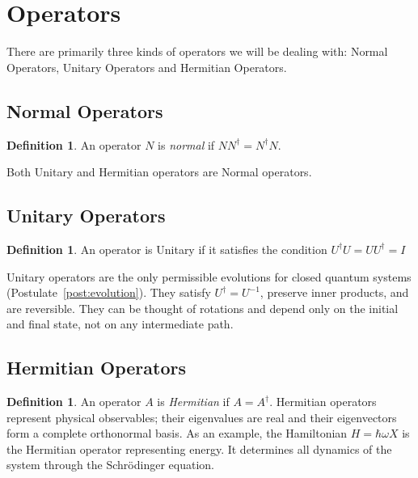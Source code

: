 \documentclass[12pt, a4paper, oneside]{report}
\theoremstyle{plain}
\theoremstyle{definition}
\newtheorem{definition}[theorem]{Definition}
\theoremstyle{remark}
\begin{document}
\section{Operators}

There are primarily three kinds of operators we will be dealing with: Normal Operators, Unitary Operators and Hermitian Operators. 

\subsection{Normal Operators}
\begin{definition}
An operator $N$ is \emph{normal} if $NN^\dagger = N^\dagger N$.
\end{definition}

Both Unitary and Hermitian operators are Normal operators.

\subsection{Unitary Operators}
\begin{definition}
    An operator is Unitary if it satisfies the condition $U^\dagger U = U U^\dagger = I$
\end{definition}
Unitary operators are the only permissible evolutions for closed quantum systems
(Postulate~\ref{post:evolution}). They satisfy $U^\dagger = U^{-1}$, preserve inner products,
and are reversible. They can be thought of rotations and depend only on the initial and final state, not
on any intermediate path. 

\subsection{Hermitian Operators}

\begin{definition}
An operator $A$ is \emph{Hermitian} if $A = A^\dagger$. Hermitian operators represent
physical observables; their eigenvalues are real and their eigenvectors form a complete
orthonormal basis.
As an example, the Hamiltonian $H = \hbar\omega X$ is the Hermitian operator representing energy. It
determines all dynamics of the system through the Schr\"{o}dinger equation.


\end{definition}



\end{document}

